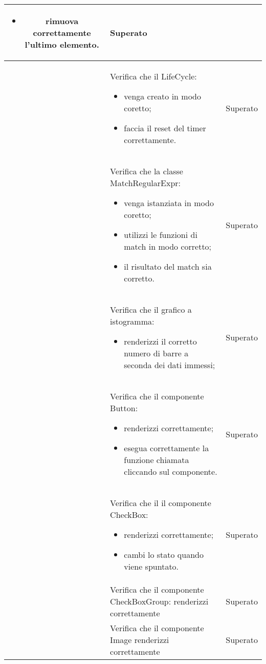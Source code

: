 \begin{longtable}{|c|P{9cm}|c|}
\begin{itemize}
		\item rimuova correttamente l'ultimo elemento.
	\end{itemize}
	& Superato \\
	\hline {}\label{tu-lifecycle} & Verifica che il LifeCycle:
	\begin{itemize}
		\item venga creato in modo coretto;
		\item faccia il reset del timer correttamente.
	\end{itemize}
	& Superato \\
	\hline {}\label{tu-regex} & Verifica che la classe MatchRegularExpr:
	\begin{itemize}
		\item venga istanziata in modo coretto;
		\item utilizzi le funzioni di match in modo corretto;
		\item il risultato del match sia corretto.
	\end{itemize}
	& Superato \\
	\hline {}\label{tu-barchart} & Verifica che il grafico a istogramma:
	\begin{itemize}
		\item renderizzi il corretto numero di barre a seconda dei dati immessi;
	\end{itemize}
	& Superato \\
	\hline {}\label{tu-button} & Verifica che il componente Button:
	\begin{itemize}
		\item renderizzi correttamente;
		\item esegua correttamente la funzione chiamata cliccando sul componente.
	\end{itemize}
	& Superato \\
	\hline {}\label{tu-checkbox} & Verifica che il il componente CheckBox:
	\begin{itemize}
		\item renderizzi correttamente;
		\item cambi lo stato quando viene spuntato.
	\end{itemize}
	& Superato \\
	\hline {}\label{tu-checkboxgroup} & Verifica che il componente CheckBoxGroup: renderizzi correttamente & Superato \\
	\hline {}\label{tu-image} & Verifica che il componente Image renderizzi correttamente	& Superato \\

\end{longtable}
